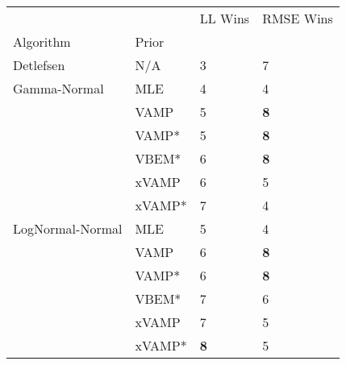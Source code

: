 \begin{tabular}{llll}
\toprule
                 &        &     LL Wins &   RMSE Wins \\
Algorithm & Prior &             &             \\
\midrule
Detlefsen & N/A &           3 &           7 \\
Gamma-Normal & MLE &           4 &           4 \\
                 & VAMP &           5 &  \textbf{8} \\
                 & VAMP* &           5 &  \textbf{8} \\
                 & VBEM* &           6 &  \textbf{8} \\
                 & xVAMP &           6 &           5 \\
                 & xVAMP* &           7 &           4 \\
LogNormal-Normal & MLE &           5 &           4 \\
                 & VAMP &           6 &  \textbf{8} \\
                 & VAMP* &           6 &  \textbf{8} \\
                 & VBEM* &           7 &           6 \\
                 & xVAMP &           7 &           5 \\
                 & xVAMP* &  \textbf{8} &           5 \\
\bottomrule
\end{tabular}

